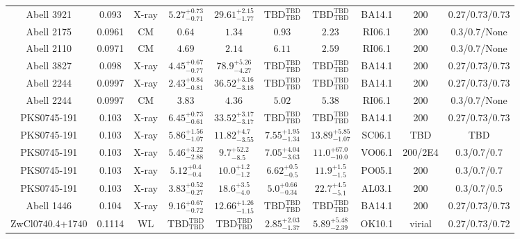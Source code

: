 \begin{table}
\begin{tabular}{cccccccccc}
Abell 3921 & 0.093 & X-ray & ${5.27}^{+0.73}_{-0.71}$ & ${29.61}^{+2.15}_{-1.77}$ & ${\mathrm{TBD}}^{\mathrm{TBD}}_{\mathrm{TBD}}$ & ${\mathrm{TBD}}^{\mathrm{TBD}}_{\mathrm{TBD}}$ & BA14.1 & 200 & 0.27/0.73/0.73 \\
Abell 2175 & 0.0961 & CM & ${0.64}^{}_{}$ & ${1.34}^{}_{}$ & ${0.93}^{}_{}$ & ${2.23}^{}_{}$ & RI06.1 & 200 & 0.3/0.7/None \\
Abell 2110 & 0.0971 & CM & ${4.69}^{}_{}$ & ${2.14}^{}_{}$ & ${6.11}^{}_{}$ & ${2.59}^{}_{}$ & RI06.1 & 200 & 0.3/0.7/None \\
Abell 3827 & 0.098 & X-ray & ${4.45}^{+0.67}_{-0.77}$ & ${78.9}^{+5.26}_{-4.27}$ & ${\mathrm{TBD}}^{\mathrm{TBD}}_{\mathrm{TBD}}$ & ${\mathrm{TBD}}^{\mathrm{TBD}}_{\mathrm{TBD}}$ & BA14.1 & 200 & 0.27/0.73/0.73 \\
Abell 2244 & 0.0997 & X-ray & ${2.43}^{+0.84}_{-0.81}$ & ${36.52}^{+3.16}_{-3.18}$ & ${\mathrm{TBD}}^{\mathrm{TBD}}_{\mathrm{TBD}}$ & ${\mathrm{TBD}}^{\mathrm{TBD}}_{\mathrm{TBD}}$ & BA14.1 & 200 & 0.27/0.73/0.73 \\
Abell 2244 & 0.0997 & CM & ${3.83}^{}_{}$ & ${4.36}^{}_{}$ & ${5.02}^{}_{}$ & ${5.38}^{}_{}$ & RI06.1 & 200 & 0.3/0.7/None \\
PKS0745-191 & 0.103 & X-ray & ${6.45}^{+0.73}_{-0.61}$ & ${33.52}^{+3.17}_{-3.17}$ & ${\mathrm{TBD}}^{\mathrm{TBD}}_{\mathrm{TBD}}$ & ${\mathrm{TBD}}^{\mathrm{TBD}}_{\mathrm{TBD}}$ & BA14.1 & 200 & 0.27/0.73/0.73 \\
PKS0745-191 & 0.103 & X-ray & ${5.86}^{+1.56}_{-1.07}$ & ${11.82}^{+4.7}_{-3.55}$ & ${7.55}^{+1.95}_{-1.34}$ & ${13.89}^{+5.85}_{-1.07}$ & SC06.1 & TBD & TBD \\
PKS0745-191 & 0.103 & X-ray & ${5.46}^{+3.22}_{-2.88}$ & ${9.7}^{+52.2}_{-8.5}$ & ${7.05}^{+4.04}_{-3.63}$ & ${11.0}^{+67.0}_{-10.0}$ & VO06.1 & 200/2E4 & 0.3/0.7/0.7 \\
PKS0745-191 & 0.103 & X-ray & ${5.12}^{+0.4}_{-0.4}$ & ${10.0}^{+1.2}_{-1.2}$ & ${6.62}^{+0.5}_{-0.5}$ & ${11.9}^{+1.5}_{-1.5}$ & PO05.1 & 200 & 0.3/0.7/0.7 \\
PKS0745-191 & 0.103 & X-ray & ${3.83}^{+0.52}_{-0.27}$ & ${18.6}^{+3.5}_{-4.0}$ & ${5.0}^{+0.66}_{-0.34}$ & ${22.7}^{+4.5}_{-5.1}$ & AL03.1 & 200 & 0.3/0.7/0.5 \\
Abell 1446 & 0.104 & X-ray & ${9.16}^{+0.67}_{-0.72}$ & ${12.66}^{+1.26}_{-1.15}$ & ${\mathrm{TBD}}^{\mathrm{TBD}}_{\mathrm{TBD}}$ & ${\mathrm{TBD}}^{\mathrm{TBD}}_{\mathrm{TBD}}$ & BA14.1 & 200 & 0.27/0.73/0.73 \\
ZwCl0740.4+1740 & 0.1114 & WL & ${\mathrm{TBD}}^{\mathrm{TBD}}_{\mathrm{TBD}}$ & ${\mathrm{TBD}}^{\mathrm{TBD}}_{\mathrm{TBD}}$ & ${2.85}^{+2.03}_{-1.37}$ & ${5.89}^{+5.48}_{-2.39}$ & OK10.1 & virial & 0.27/0.73/0.72 \\

\end{tabular}
\end{table}

